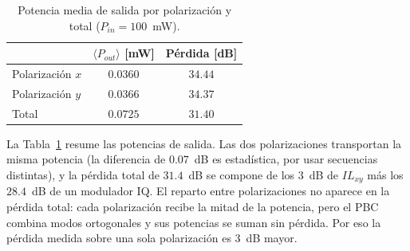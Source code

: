 \begin{table}[H]
\centering
\small
\begin{tabular}{lcc}
\toprule
& $\langle P_{out}\rangle$ [mW] & Pérdida [dB] \\
\midrule
Polarización $x$ & $0.0360$ & $34.44$ \\
Polarización $y$ & $0.0366$ & $34.37$ \\
Total            & $0.0725$ & $31.40$ \\
\bottomrule
\end{tabular}
\caption{Potencia media de salida por polarización y total
($P_{in} = 100$~mW).}
\label{tab:ej10_potencia}
\end{table}

La Tabla~\ref{tab:ej10_potencia} resume las potencias de salida. Las dos
polarizaciones transportan la misma potencia (la diferencia de
$0.07$~dB es estadística, por usar secuencias distintas), y la pérdida
total de $31.4$~dB se compone de los $3$~dB de $IL_{xy}$ más los
$28.4$~dB de un modulador IQ. El reparto entre polarizaciones no aparece en
la pérdida total: cada polarización recibe la mitad de la potencia, pero
el PBC combina modos ortogonales y sus potencias se suman sin pérdida. Por
eso la pérdida medida sobre una sola polarización es $3$~dB mayor.
